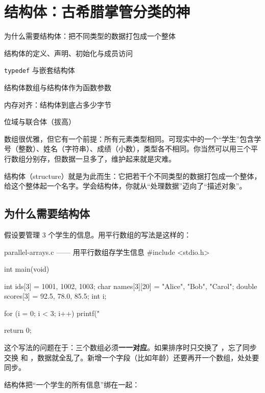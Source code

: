 \chapter{结构体：古希腊掌管分类的神}

\begin{introduction}
  \item 为什么需要结构体：把不同类型的数据打包成一个整体
  \item 结构体的定义、声明、初始化与成员访问
  \item \texttt{typedef} 与嵌套结构体
  \item 结构体数组与结构体作为函数参数
  \item 内存对齐：结构体到底占多少字节
  \item 位域与联合体（拔高）
\end{introduction}


数组很优雅，但它有一个前提：所有元素类型相同。可现实中的一个“学生”包含学号（整数）、姓名（字符串）、成绩（小数），类型各不相同。你当然可以用三个平行数组分别存，但数据一旦多了，维护起来就是灾难。

结构体（structure）就是为此而生：它把若干个不同类型的数据打包成一个整体，给这个整体起一个名字。学会结构体，你就从“处理数据”迈向了“描述对象”。

\section{为什么需要结构体}

假设要管理 3 个学生的信息。用平行数组的写法是这样的：

\begin{codebox}{parallel-arrays.c —— 用平行数组存学生信息}
#include <stdio.h>

int main(void)
{
    int ids[3] = {1001, 1002, 1003};
    char names[3][20] = {"Alice", "Bob", "Carol"};
    double scores[3] = {92.5, 78.0, 85.5};
    int i;

    for (i = 0; i < 3; i++) {
        printf("%
    }

    return 0;
}
\end{codebox}

这个写法的问题在于：三个数组必须\textbf{一一对应}。如果排序时只交换了 ，忘了同步交换  和 ，数据就全乱了。新增一个字段（比如年龄）还要再开一个数组，处处要同步。

结构体把“一个学生的所有信息”绑在一起：

